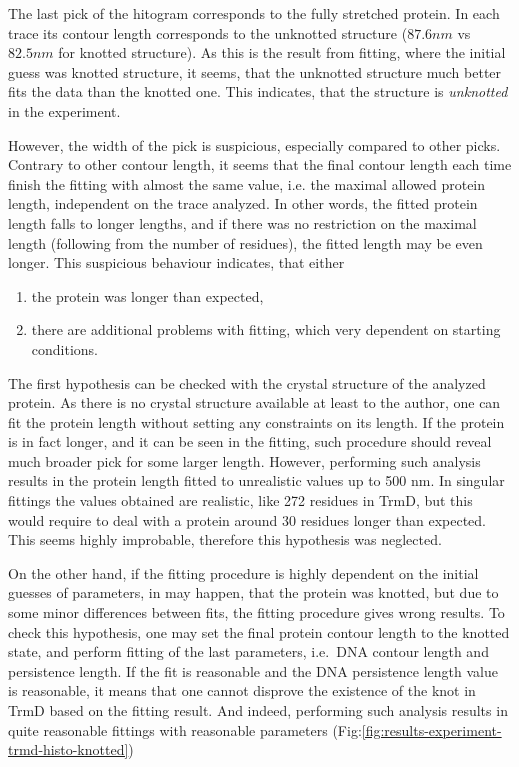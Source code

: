 The last pick of the hitogram corresponds to the fully stretched protein.
In each trace its contour length corresponds to the unknotted structure ($87.6 nm$ vs $82.5 nm$ for knotted structure).
As this is the result from fitting, where the initial guess was knotted structure, it seems, that the unknotted structure much better fits the data than the knotted one.
This indicates, that the structure is \textit{unknotted} in the experiment.

However, the width of the pick is suspicious, especially compared to other picks.
Contrary to other contour length, it seems that the final contour length each time finish the fitting with almost the same value, i.e. the maximal allowed protein length, independent on the trace analyzed.
In other words, the fitted protein length falls to longer lengths, and if there was no restriction on the maximal length (following from the number of residues), the fitted length may be even longer.
This suspicious behaviour indicates, that either

\begin{enumerate}
    \item the protein was longer than expected,
    \item there are additional problems with fitting, which very dependent on starting conditions.
\end{enumerate}

The first hypothesis can be checked with the crystal structure of the analyzed protein.
As there is no crystal structure available at least to the author, one can fit the protein length without setting any constraints on its length.
If the protein is in fact longer, and it can be seen in the fitting, such procedure should reveal much broader pick for some larger length.
However, performing such analysis results in the protein length fitted to unrealistic values up to 500 nm.
In singular fittings the values obtained are realistic, like 272 residues in TrmD, but this would require to deal with a protein around 30 residues longer than expected.
This seems highly improbable, therefore this hypothesis was neglected.

On the other hand, if the fitting procedure is highly dependent on the initial guesses of parameters, in may happen, that the protein was knotted, but due to some minor differences between fits, the fitting procedure gives wrong results.
To check this hypothesis, one may set the final protein contour length to the knotted state, and perform fitting of the last parameters, i.e.\ DNA contour length and persistence length.
If the fit is reasonable and the DNA persistence length value is reasonable, it means that one cannot disprove the existence of the knot in TrmD based on the fitting result.
And indeed, performing such analysis results in quite reasonable fittings with reasonable parameters (Fig:\ref{fig:results-experiment-trmd-histo-knotted})


